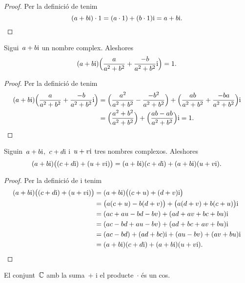 \documentclass[../analisi-complexa.tex]{subfiles}
\begin{document}
    \begin{proof}
        Per la definició de  tenim
        \[
            (a+b\mathrm{i})\cdot1 = (a\cdot1)+(b\cdot1)\mathrm{i} = a+b\mathrm{i}.\qedhere
        \]
    \end{proof}
    \begin{proposition}
        \label{prop:element-invers-pel-producte-de-nombres-complexos}
        Sigui~\(a+b\mathrm{i}\) un nombre complex.
        Aleshores
        \[
            (a+b\mathrm{i})\Big(\frac{a}{a^{2}+b^{2}} + \frac{-b}{a^{2}+b^{2}}\mathrm{i}\Big)
            = 1.
        \]
    \end{proposition}
    \begin{proof}
        Per la definició de  tenim
        \begin{align*}
            (a+b\mathrm{i})\Big(\frac{a}{a^{2}+b^{2}}+\frac{-b}{a^{2}+b^{2}}\mathrm{i}\Big)
                &= \Big(\frac{a^{2}}{a^{2}+b^{2}}-\frac{-b^{2}}{a^{2}+b^{2}}\Big)
                   +\Big(\frac{ab}{a^{2}+b^{2}}+\frac{-ba}{a^{2}+b^{2}}\Big)\mathrm{i} \\
                &= \Big(\frac{a^{2}+b^{2}}{a^{2}+b^{2}}\Big)
                   +\Big(\frac{ab-ab}{a^{2}+b^{2}}\Big)\mathrm{i} = 1.\qedhere
        \end{align*}
    \end{proof}
    \begin{proposition}
        \label{prop:distribuitva-del-producte-respecte-la-suma-de-nombres-complexos}
        Siguin~\(a+b\mathrm{i}\),~\(c+d\mathrm{i}\) i~\(u+v\mathrm{i}\) tres nombres complexos.
        Aleshores
        \[
            (a+b\mathrm{i})\big((c+d\mathrm{i})+(u+v\mathrm{i})\big) = (a+b\mathrm{i})(c+d\mathrm{i})+(a+b\mathrm{i})(u+v\mathrm{i}).
        \]
    \end{proposition}
    \begin{proof}
        Per la definició de 
        i  tenim
        \begin{align*}
            (a+b\mathrm{i})\big((c+d\mathrm{i})+(u+v\mathrm{i})\big)
                &= (a+b\mathrm{i})\big((c+u)+(d+v)\mathrm{i}\big) \\
                &= \big(a(c+u)-b(d+v)\big)+\big(a(d+v)+b(c+u)\big)\mathrm{i} \\
                &= (ac+au-bd-bv)+(ad+av+bc+bu)\mathrm{i} \\
                &= (ac-bd+au-bv)+(ad+bc+av+bu)\mathrm{i}\\
                &= (ac-bd)+(ad+bc)\mathrm{i}+(au-bv)+(av+bu)\mathrm{i} \\
                &= (a+b\mathrm{i})(c+d\mathrm{i})+(a+b\mathrm{i})(u+v\mathrm{i}).\qedhere
        \end{align*}
    \end{proof}
    \begin{corollary}
        \label{cor:els-complexos-formen-un-cos}
        El conjunt~\(\mathbb{C}\) amb la suma~\(+\)
        i el producte~\(\cdot\) és un cos.
    \end{corollary}
\end{document}
